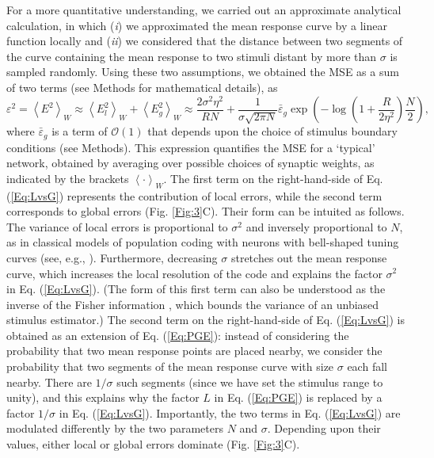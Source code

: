 \documentclass[a4paper]{article}%
\begin{document}
For a more quantitative understanding, we carried out an approximate
analytical calculation, in which (\textit{i}) we approximated the mean
response curve by a linear function locally and (\textit{ii}) we considered
that the distance between two segments of the curve containing the mean
response to two stimuli distant by more than $\sigma$ is sampled randomly.
Using these two assumptions, we obtained the MSE as a sum of two terms (see
Methods for mathematical details), as 
\begin{equation}
\varepsilon^{2}=\left\langle E^{2}\right\rangle _{W}\approx\left\langle
E_{l}^{2}\right\rangle _{W}+\left\langle E_{g}^{2}\right\rangle _{W}
\approx\frac{2\sigma^{2}\eta^{2}}{RN}+\frac{1}{\sigma\sqrt{2\pi N}}
\bar{\varepsilon}_{g}\exp\left(  {-\log}\left(  {1+\frac{R}{2\eta^{2}}
}\right)  \frac{N}{2}\right)  , \label{Eq:LvsG}
\end{equation}
where $\bar{\varepsilon}_{g}$ is a term of $\mathcal{O}\left(  1\right)  $
that depends upon the choice of stimulus boundary conditions (see Methods).
This expression quantifies the MSE for a `typical' network, obtained by
averaging over possible choices of synaptic weights, as indicated by the
brackets $\left\langle \cdot\right\rangle _{W}$. The first term on the
right-hand-side of Eq. (\ref{Eq:LvsG}) represents the contribution of local
errors, while the second term corresponds to global errors (Fig.
\ref{Fig:3}C). Their form can be intuited as follows. The variance of local
errors is proportional to $\sigma^{2}$ and inversely proportional to $N$, as
in classical models of population coding with neurons with bell-shaped tuning
curves (see, e.g., \cite{Zhang1999NeuronalBroaden}). Furthermore,
decreasing $\sigma$ stretches out the mean response curve, which increases the
local resolution of the code and explains the factor $\sigma^{2}$ in Eq.
(\ref{Eq:LvsG}). (The form of this first term can also be understood as the
inverse of the Fisher information
\cite[]{Seung1993SimpleCodes,Brunel1998MutualCoding}, which bounds the variance
of an unbiased stimulus estimator.) The second term on the right-hand-side of Eq. (\ref{Eq:LvsG})
is obtained as an extension of Eq. (\ref{Eq:PGE}): instead of considering the
probability that two mean response points are placed nearby, we consider the
probability that two segments of the mean response curve with size $\sigma$
each fall nearby. There are $1/\sigma$ such segments (since we have set the
stimulus range to unity), and this explains why the factor $L$ in Eq.
(\ref{Eq:PGE}) is replaced by a factor $1/\sigma$ in Eq. (\ref{Eq:LvsG}).
Importantly, the two terms in Eq. (\ref{Eq:LvsG}) are modulated differently by
the two parameters $N$ and $\sigma$. Depending upon their values, either local
or global errors dominate (Fig. \ref{Fig:3}C).
\end{document}

